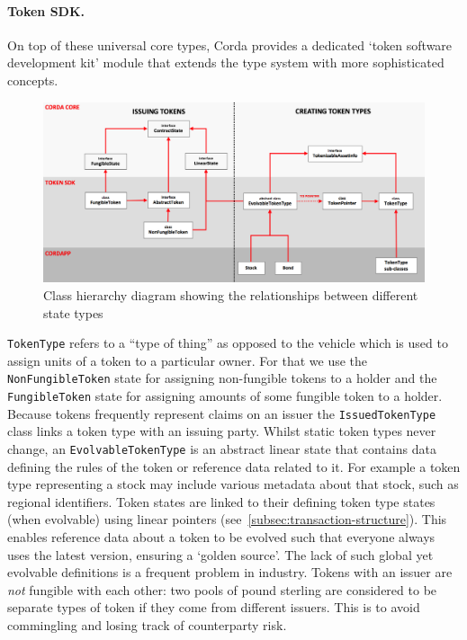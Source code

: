\documentclass{article}
\begin{document}
\paragraph{Token SDK.}On top of these universal core types, Corda provides a dedicated `token software development
kit' module that  extends the type system with more sophisticated concepts.

\begin{figure}[H]
\includegraphics[width=\textwidth]{state-class-hierarchy}
\caption{Class hierarchy diagram showing the relationships between different state types}
\end{figure}

\texttt{TokenType} refers to a ``type of thing'' as opposed to the vehicle which is used to assign units of a token
to a particular owner. For that we use the \texttt{NonFungibleToken} state for assigning non-fungible tokens to a
holder and the \texttt{FungibleToken} state for assigning amounts of some fungible token to a holder. Because
tokens frequently represent claims on an issuer the \texttt{IssuedTokenType} class links a token type with an
issuing party. Whilst static token types never change, an \texttt{EvolvableTokenType} is an abstract linear state
that contains data defining the rules of the token or reference data related to it. For example a token type
representing a stock may include various metadata about that stock, such as regional identifiers. Token states are
linked to their defining token type states (when evolvable) using linear pointers
(see~\cref{subsec:transaction-structure}). This enables reference data about a token to be evolved such that
everyone always uses the latest version, ensuring a `golden source'. The lack of such global yet evolvable
definitions is a frequent problem in industry. Tokens with an issuer are \emph{not} fungible with each other: two
pools of pound sterling are considered to be separate types of token if they come from different issuers. This is
to avoid commingling and losing track of counterparty risk.
\end{document}
